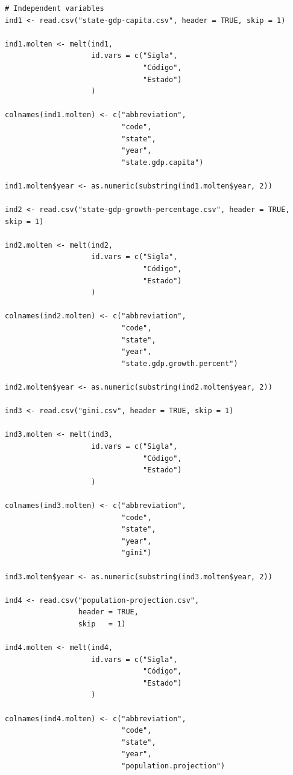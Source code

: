 \newpage

\begin{verbatim}
# Independent variables
ind1 <- read.csv("state-gdp-capita.csv", header = TRUE, skip = 1)

ind1.molten <- melt(ind1,
                    id.vars = c("Sigla",
                                "Código",
                                "Estado")
                    )

colnames(ind1.molten) <- c("abbreviation",
                           "code",
                           "state",
                           "year",
                           "state.gdp.capita")

ind1.molten$year <- as.numeric(substring(ind1.molten$year, 2))

ind2 <- read.csv("state-gdp-growth-percentage.csv", header = TRUE, skip = 1)

ind2.molten <- melt(ind2,
                    id.vars = c("Sigla",
                                "Código",
                                "Estado")
                    )

colnames(ind2.molten) <- c("abbreviation",
                           "code",
                           "state",
                           "year",
                           "state.gdp.growth.percent")

ind2.molten$year <- as.numeric(substring(ind2.molten$year, 2))

ind3 <- read.csv("gini.csv", header = TRUE, skip = 1)

ind3.molten <- melt(ind3,
                    id.vars = c("Sigla",
                                "Código",
                                "Estado")
                    )

colnames(ind3.molten) <- c("abbreviation",
                           "code",
                           "state",
                           "year",
                           "gini")

ind3.molten$year <- as.numeric(substring(ind3.molten$year, 2))

ind4 <- read.csv("population-projection.csv",
                 header = TRUE,
                 skip   = 1)

ind4.molten <- melt(ind4,
                    id.vars = c("Sigla",
                                "Código",
                                "Estado")
                    )

colnames(ind4.molten) <- c("abbreviation",
                           "code",
                           "state",
                           "year",
                           "population.projection")


\end{verbatim}
